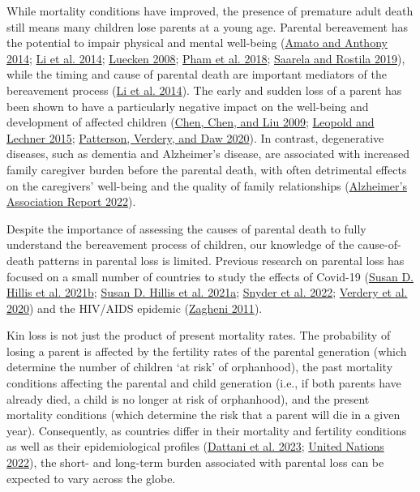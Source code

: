 \documentclass[
  11pt,
  letterpaper,
]{article}
\begin{document}
While mortality conditions have improved, the presence of premature adult death still means many children lose parents at a young age. Parental bereavement has the potential to impair physical and mental well-being (\protect\hyperlink{ref-amato2014death}{Amato and Anthony 2014}; \protect\hyperlink{ref-li2014mortality}{Li et al. 2014}; \protect\hyperlink{ref-luecken2008parental}{Luecken 2008}; \protect\hyperlink{ref-pham2018burden}{Pham et al. 2018}; \protect\hyperlink{ref-saarela2018mortality}{Saarela and Rostila 2019}), while the timing and cause of parental death are important mediators of the bereavement process (\protect\hyperlink{ref-li2014mortality}{Li et al. 2014}). The early and sudden loss of a parent has been shown to have a particularly negative impact on the well-being and development of affected children (\protect\hyperlink{ref-chen2009education}{Chen, Chen, and Liu 2009}; \protect\hyperlink{ref-leopold2015bereavement}{Leopold and Lechner 2015}; \protect\hyperlink{ref-patterson2020linked}{Patterson, Verdery, and Daw 2020}). In contrast, degenerative diseases, such as dementia and Alzheimer's disease, are associated with increased family caregiver burden before the parental death, with often detrimental effects on the caregivers' well-being and the quality of family relationships (\protect\hyperlink{ref-alzheimers2022}{Alzheimer's Association Report 2022}).

Despite the importance of assessing the causes of parental death to fully understand the bereavement process of children, our knowledge of the cause-of-death patterns in parental loss is limited. Previous research on parental loss has focused on a small number of countries to study the effects of Covid-19 (\protect\hyperlink{ref-hillis2021global}{Susan D. Hillis et al. 2021b}; \protect\hyperlink{ref-hillis2021us}{Susan D. Hillis et al. 2021a}; \protect\hyperlink{ref-snyder2022covid}{Snyder et al. 2022}; \protect\hyperlink{ref-verdery2020covid}{Verdery et al. 2020}) and the HIV/AIDS epidemic (\protect\hyperlink{ref-zagheni2011impact}{Zagheni 2011}).

Kin loss is not just the product of present mortality rates. The probability of losing a parent is affected by the fertility rates of the parental generation (which determine the number of children `at risk' of orphanhood), the past mortality conditions affecting the parental and child generation (i.e., if both parents have already died, a child is no longer at risk of orphanhood), and the present mortality conditions (which determine the risk that a parent will die in a given year). Consequently, as countries differ in their mortality and fertility conditions as well as their epidemiological profiles (\protect\hyperlink{ref-owid-causes-of-death}{Dattani et al. 2023}; \protect\hyperlink{ref-united2022world}{United Nations 2022}), the short- and long-term burden associated with parental loss can be expected to vary across the globe.
\end{document}
